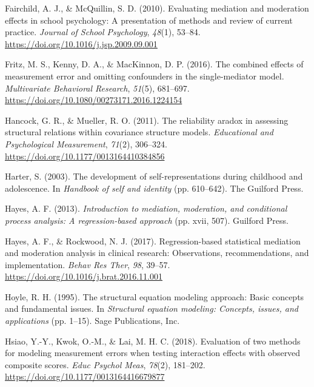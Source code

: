 \documentclass[
  man]{apa7}
\newlength{\cslhangindent}
\newlength{\cslentryspacingunit} %
\newenvironment{CSLReferences}[2] %
 {%
  \setlength{\parindent}{0pt}
  \ifodd #1
  \let\oldpar\par
  \def\par{\hangindent=\cslhangindent\oldpar}
  \fi
  \setlength{\parskip}{#2\cslentryspacingunit}
 }%
 {}
\begin{document}
\begin{CSLReferences}{1}{0}
\leavevmode{}%
Fairchild, A. J., \& McQuillin, S. D. (2010). Evaluating mediation and moderation effects in school psychology: {A} presentation of methods and review of current practice. \emph{Journal of School Psychology}, \emph{48}(1), 53--84. \url{https://doi.org/10.1016/j.jsp.2009.09.001}

\leavevmode{}%
Fritz, M. S., Kenny, D. A., \& MacKinnon, D. P. (2016). The combined effects of measurement error and omitting confounders in the single-mediator model. \emph{Multivariate Behavioral Research}, \emph{51}(5), 681--697. \url{https://doi.org/10.1080/00273171.2016.1224154}

\leavevmode{}%
Hancock, G. R., \& Mueller, R. O. (2011). The reliability aradox in assessing structural relations within covariance structure models. \emph{Educational and Psychological Measurement}, \emph{71}(2), 306--324. \url{https://doi.org/10.1177/0013164410384856}

\leavevmode{}%
Harter, S. (2003). The development of self-representations during childhood and adolescence. In \emph{Handbook of self and identity} (pp. 610--642). The Guilford Press.

\leavevmode{}%
Hayes, A. F. (2013). \emph{Introduction to mediation, moderation, and conditional process analysis: {A} regression-based approach} (pp. xvii, 507). Guilford Press.

\leavevmode{}%
Hayes, A. F., \& Rockwood, N. J. (2017). Regression-based statistical mediation and moderation analysis in clinical research: {Observations}, recommendations, and implementation. \emph{Behav Res Ther}, \emph{98}, 39--57. \url{https://doi.org/10.1016/j.brat.2016.11.001}

\leavevmode{}%
Hoyle, R. H. (1995). The structural equation modeling approach: {Basic} concepts and fundamental issues. In \emph{Structural equation modeling: {Concepts}, issues, and applications} (pp. 1--15). Sage Publications, Inc.

\leavevmode{}%
Hsiao, Y.-Y., Kwok, O.-M., \& Lai, M. H. C. (2018). Evaluation of two methods for modeling measurement errors when testing interaction effects with observed composite scores. \emph{Educ Psychol Meas}, \emph{78}(2), 181--202. \url{https://doi.org/10.1177/0013164416679877}


\end{CSLReferences}
\end{document}
